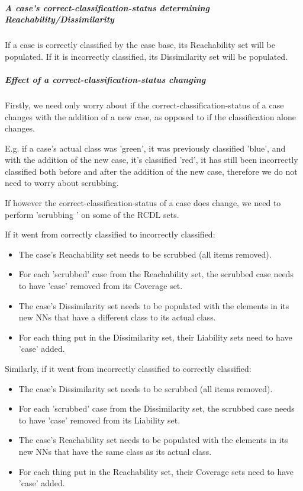 \documentclass[a4paper,11pt]{report}
\begin{document}
\subparagraph{A case's correct-classification-status determining Reachability/Dissimilarity}
If a case is correctly classified by the case base, its Reachability set will be populated. If it is incorrectly classified, its Dissimilarity set will be populated.
 
\subparagraph{Effect of a correct-classification-status changing}
Firstly, we need only worry about if the correct-classification-status of a case changes with the addition of a new case, as opposed to if the classification alone changes.

E.g. if a case's actual class was 'green', it was previously classified 'blue', and with the addition of the new case, it's classified 'red', it has still been incorrectly classified both before and after the addition of the new case, therefore we do not need to worry about scrubbing.

If however the correct-classification-status of a case does change, we need to perform 'scrubbing ' on some of the RCDL sets.

If it went from correctly classified to incorrectly classified:
\begin{itemize}
	\item The case's Reachability set needs to be scrubbed (all items removed).
	\item For each 'scrubbed' case from the Reachability set, the scrubbed case needs to have 'case' removed from its Coverage set.
	\item The case's Dissimilarity set needs to be populated with the elements in its new NNs that have a different class to its actual class.
	\item For each thing put in the Dissimilarity set, their Liability sets need to have 'case' added.
\end{itemize}

Similarly, if it went from incorrectly classified to correctly classified:
\begin{itemize}
	\item The case's Dissimilarity set needs to be scrubbed (all items removed).
	\item For each 'scrubbed' case from the Dissimilarity set, the scrubbed case needs to have 'case' removed from its Liability set.
	\item The case's Reachability set needs to be populated with the elements in its new NNs that have the same class as its actual class.
	\item For each thing put in the Reachability set, their Coverage sets need to have 'case' added.
\end{itemize}
\end{document}
